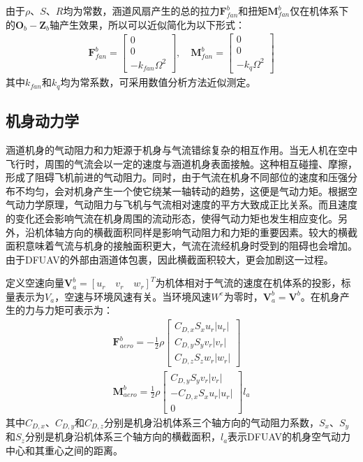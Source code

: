 由于$\rho$、$S$、$R$均为常数，涵道风扇产生的总的拉力$\boldsymbol{F}_{fan}^b$和扭矩$\boldsymbol{M}_{fan}^b$仅在机体系下的${\boldsymbol{O}_b}-{\boldsymbol{Z}_b}$轴产生效果，所以可以近似简化为以下形式\cite{choiStaticAnalysisSmall2012,manzoorCompositeObserverbasedRobust2023}：
\begin{align}
            \boldsymbol{F}_{fan}^b=\begin{bmatrix}0 \\ 0 \\
                -k_{fan}\Omega^2
            \end{bmatrix},\quad    
            \boldsymbol{M}_{fan}^b=\begin{bmatrix}0 \\ 0 \\
            -k_{q}\Omega^2
            \end{bmatrix}    \label{eq_22}
\end{align}
其中$k_{fan}$和$k_{q}$均为常系数，可采用数值分析方法近似测定。
\subsection{机身动力学}

涵道机身的气动阻力和力矩源于机身与气流错综复杂的相互作用。当无人机在空中飞行时，周围的气流会以一定的速度与涵道机身表面接触。这种相互碰撞、摩擦，形成了阻碍飞机前进的气动阻力。同时，由于气流在机身不同部位的速度和压强分布不均匀，会对机身产生一个使它绕某一轴转动的趋势，这便是气动力矩。根据空气动力学原理，气动阻力与飞机与气流相对速度的平方大致成正比关系。而且速度的变化还会影响气流在机身周围的流动形态，使得气动力矩也发生相应变化。另外，沿机体轴方向的横截面积同样是影响气动阻力和力矩的重要因素。较大的横截面积意味着气流与机身的接触面积更大，气流在流经机身时受到的阻碍也会增加。由于DFUAV的外部由涵道体包裹，因此横截面积较大，更会加剧这一过程。

定义空速向量$\boldsymbol{V}_a^b= [ u_r \quad v_r \quad w_r ]^T$为机体相对于气流的速度在机体系的投影，标量表示为$V_a$，空速与环境风速有关。当环境风速$W^e$为零时，$\boldsymbol{V}_a^b=\boldsymbol{V}^b$。在机身产生的力与力矩可表示为\cite{johnsonModelingControlFlight2006b,choiStaticAnalysisSmall2012}：
\begin{gather}
    \boldsymbol{F}_{aero}^b=-\frac{1}{2}\rho
    \begin{bmatrix}
    C_{D,x}S_xu_r|u_r| \\
    C_{D,y}S_yv_r|v_r| \\
    C_{D,z}S_zw_r|w_r|
    \end{bmatrix}\label{eq_22.5}\\
    \boldsymbol{M}_{aero}^b=\frac{1}{2}\rho
    \begin{bmatrix}
    C_{D,y}S_yv_r|v_r| \\
    -C_{D,x}S_xu_r|u_r| \\
    0
    \end{bmatrix}l_{a}
    \label{eq_23}
\end{gather}
其中$C_{D,x}$、$C_{D,y}$和$C_{D,z}$分别是机身沿机体系三个轴方向的气动阻力系数，$S_x$、$S_y$和$S_z$分别是机身沿机体系三个轴方向的横截面积，$l_{a}$表示DFUAV的机身空气动力中心和其重心之间的距离。

